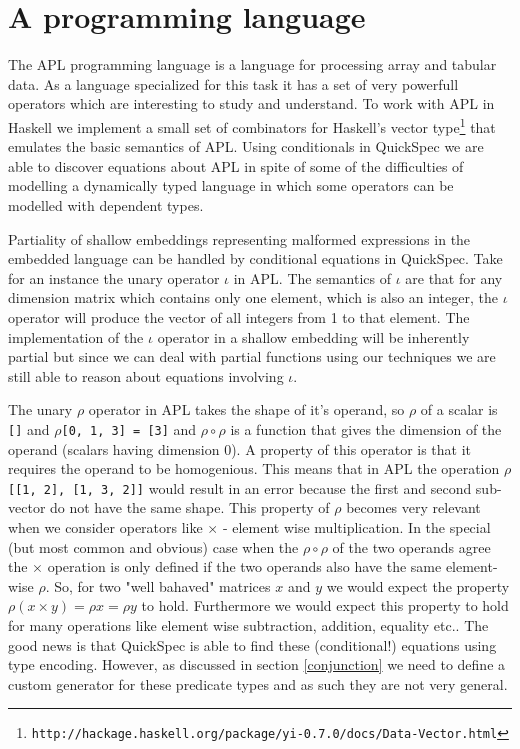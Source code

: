 \section{A programming language}\label{apl}
The APL programming language \cite{Iverson1962}
is a language for processing array and tabular data.
As a language specialized for this task it has a set of very powerfull
operators which are interesting to study and understand.
To work with APL in Haskell we implement a small
set of combinators for Haskell's vector
type\footnote{\texttt{http://hackage.haskell.org/package/yi-0.7.0/docs/Data-Vector.html}}
that emulates the basic semantics of APL.
Using conditionals in QuickSpec we are able to discover
equations about APL in spite of some of the
difficulties of modelling a dynamically typed language
in which some operators can be modelled with dependent types.

Partiality of shallow embeddings representing malformed expressions in the
embedded language can be handled by conditional equations in QuickSpec.
Take for an instance the unary operator $\iota$ in APL. The semantics
of $\iota$ are that for any dimension matrix which contains only one element, which is also
an integer, the $\iota$ operator will produce the vector of all integers from 1 to that element.
The implementation of the $\iota$ operator in a shallow embedding will be inherently partial
but since we can deal with partial functions using our techniques we are still able to reason
about equations involving $\iota$.

The unary $\rho$ operator in APL takes the shape of it's operand,
so $\rho$ of a scalar is \texttt{[]} 
and $\rho$\texttt{[0, 1, 3] = [3]} and
$\rho\circ\rho$ is a function that gives the dimension of the operand (scalars having dimension 0).
A property of this operator is that it requires the operand to be homogenious.
This means that in APL the operation $\rho$\texttt{[[1, 2], [1, 3, 2]]}
would result in an error because the first and second sub-vector do not have the same shape.
This property of $\rho$ becomes very relevant when we consider operators like $\times$ - element wise
multiplication. In the special (but most common and obvious) case
when the $\rho\circ\rho$ of the two operands agree the $\times$ operation
is only defined if the two operands also have the same element-wise $\rho$. So, for two "well bahaved" matrices
$x$ and $y$ we would expect the property $\rho(x \times y) = \rho x = \rho y$ to hold. Furthermore
we would expect this property to hold for many operations like element wise subtraction, addition, equality etc..
The good news is that QuickSpec is able to find these (conditional!) equations using type encoding. However,
as discussed in section \ref{conjunction} we need to define a custom generator for these predicate types
and as such they are not very general.
